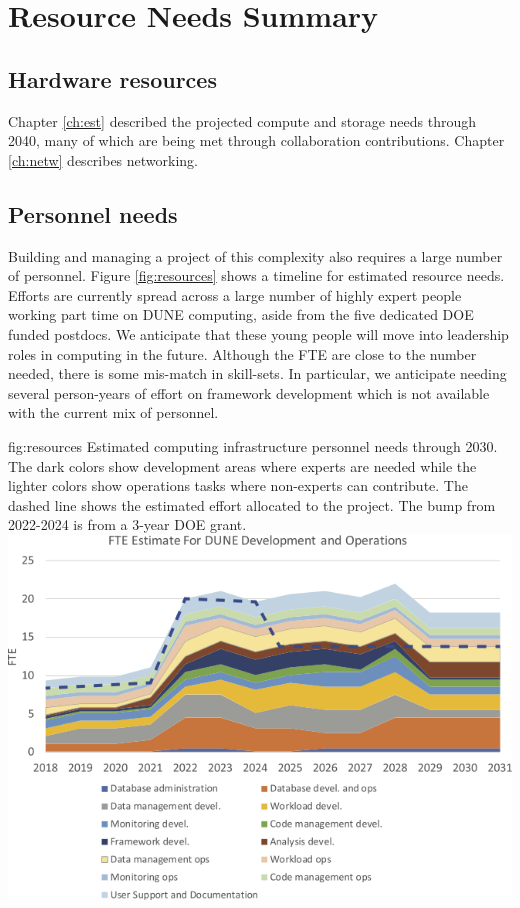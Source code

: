 \documentclass[../main-v1.tex]{subfiles}
\begin{document}
\chapter{Resource Needs Summary}
\label{ch:resource}

\section{Hardware resources}
Chapter \ref{ch:est} described the projected compute and storage needs through 2040, many of which are being met through collaboration contributions. Chapter \ref{ch:netw} describes networking. 



\section{Personnel needs}
Building and managing a project of this complexity also requires a large number of personnel.  Figure \ref{fig:resources} shows a timeline for estimated resource needs.   Efforts are currently spread across a large number of highly expert people working part time on DUNE computing, aside from the five dedicated DOE funded postdocs.  We anticipate that these young people will move into leadership roles in computing in the future.  Although the  FTE are close to the number needed, there is some mis-match in skill-sets. In particular, we anticipate needing several person-years of effort on framework development which is not available with the current mix of personnel. 

\begin{dunefigure}
{fig:resources}
{Estimated computing infrastructure personnel needs through 2030.  The dark colors show development areas where experts are needed while the lighter colors show operations tasks where non-experts can contribute. The dashed line shows the estimated effort allocated to the project.  The bump from 2022-2024 is from a 3-year DOE grant.}
{\includegraphics[width=0.9 \textwidth]{graphics/Resources/DetailNeeds-2022-02.xlsx.png}}
\end{dunefigure}
\end{document}

